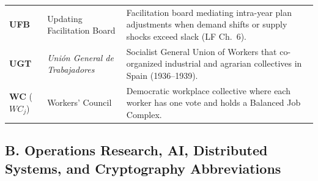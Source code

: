 \documentclass[10pt,twoside,openany]{book}
\theoremstyle{dpepstyle}
\begin{document}
{\begin{longtable}{L{0.92in} L{1.75in} L{1.95in}}
\textbf{UFB} & Updating Facilitation Board & Facilitation board mediating intra-year plan adjustments when demand shifts or supply shocks exceed slack (LF Ch.~6). \\
\textbf{UGT} & \emph{Uni\'on General de Trabajadores} & Socialist General Union of Workers that co-organized industrial and agrarian collectives in Spain (1936--1939). \\
\textbf{WC} ($WC_j$) & Workers' Council & Democratic workplace collective where each worker has one vote and holds a Balanced Job Complex. \\
\end{longtable}}

\subsection*{B. Operations Research, AI, Distributed Systems, and Cryptography Abbreviations}
\end{document}
